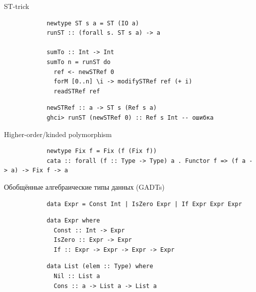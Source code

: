     \begin{frame}[fragile]{ST-trick}
        \pause
        \begin{verbatim}
            newtype ST s a = ST (IO a)
            runST :: (forall s. ST s a) -> a

            sumTo :: Int -> Int
            sumTo n = runST do
              ref <- newSTRef 0
              forM [0..n] \i -> modifySTRef ref (+ i)
              readSTRef ref
        \end{verbatim}

        \pause\hspace{2em}
        \begin{verbatim}
            newSTRef :: a -> ST s (Ref s a)
            ghci> runST (newSTRef 0) :: Ref s Int -- ошибка
        \end{verbatim}
    \end{frame}

    \begin{frame}[fragile]{Higher-order/kinded polymorphism}
        \pause
        \begin{verbatim}
            newtype Fix f = Fix (f (Fix f))
            cata :: forall (f :: Type -> Type) a . Functor f => (f a -> a) -> Fix f -> a
        \end{verbatim}
    \end{frame}

    \begin{frame}[fragile]{Обобщённые алгебраические типы данных (GADTs)}
        \pause
        \begin{verbatim}
            data Expr = Const Int | IsZero Expr | If Expr Expr Expr
        \end{verbatim}

        \pause\hspace{2em}
        \begin{verbatim}
            data Expr where
              Const :: Int -> Expr
              IsZero :: Expr -> Expr
              If :: Expr -> Expr -> Expr -> Expr
        \end{verbatim}

        \pause\hspace{2em}
        \begin{verbatim}
            data List (elem :: Type) where
              Nil :: List a
              Cons :: a -> List a -> List a
        \end{verbatim}
    \end{frame}

